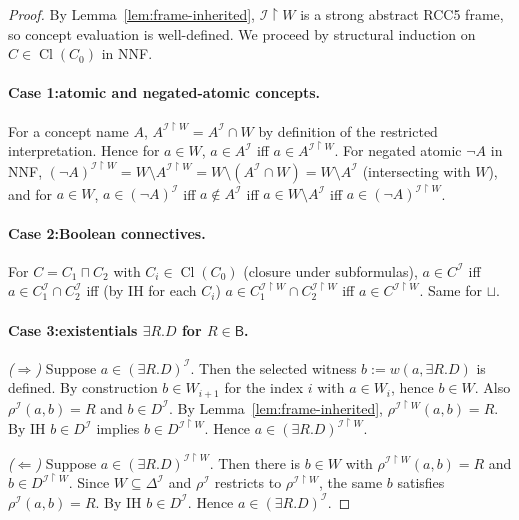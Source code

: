 \documentclass[11pt]{article}
\newcommand{\Cl}{\operatorname{Cl}}
\newcommand{\Base}{\mathsf{B}}
\newcommand{\I}{\mathcal{I}}
\begin{document}
\begin{proof}
By Lemma~\ref{lem:frame-inherited}, \(\I \restriction W\) is a
strong abstract RCC5 frame, so concept evaluation is well-defined.
We proceed by structural induction on \(C \in \Cl(C_0)\) in NNF.

\paragraph{Case 1:\@ atomic and negated-atomic concepts.}
For a concept name \(A\), \(A^{\I \restriction W} = A^\I \cap W\)
by definition of the restricted interpretation.  Hence for
\(a \in W\), \(a \in A^\I\) iff \(a \in A^{\I \restriction W}\).
For negated atomic \(\neg A\) in NNF,
\((\neg A)^{\I \restriction W} = W \setminus A^{\I \restriction W} =
W \setminus (A^\I \cap W) = W \setminus A^\I\) (intersecting with
\(W\)), and for \(a \in W\), \(a \in (\neg A)^\I\) iff \(a \notin A^\I\)
iff \(a \in W \setminus A^\I\) iff \(a \in (\neg A)^{\I \restriction W}\).

\paragraph{Case 2:\@ Boolean connectives.}
For \(C = C_1 \sqcap C_2\) with \(C_i \in \Cl(C_0)\) (closure under
subformulas), \(a \in C^\I\) iff \(a \in C_1^\I \cap C_2^\I\) iff
(by IH for each \(C_i\)) \(a \in C_1^{\I \restriction W} \cap
C_2^{\I \restriction W}\) iff \(a \in C^{\I \restriction W}\).
Same for \(\sqcup\).

\paragraph{Case 3:\@ existentials \(\exists R.D\) for \(R \in \Base\).}
\emph{(\(\Rightarrow\))} Suppose \(a \in (\exists R.D)^\I\).  Then
the selected witness \(b := w(a, \exists R.D)\) is defined.  By
construction \(b \in W_{i+1}\) for the index \(i\) with \(a \in W_i\),
hence \(b \in W\).  Also \(\rho^\I(a, b) = R\) and \(b \in D^\I\).
By Lemma~\ref{lem:frame-inherited},
\(\rho^{\I \restriction W}(a, b) = R\).  By IH \(b \in D^\I\) implies
\(b \in D^{\I \restriction W}\).  Hence
\(a \in (\exists R.D)^{\I \restriction W}\).

\emph{(\(\Leftarrow\))} Suppose \(a \in (\exists R.D)^{\I \restriction W}\).
Then there is \(b \in W\) with
\(\rho^{\I \restriction W}(a, b) = R\) and \(b \in D^{\I \restriction W}\).
Since \(W \subseteq \Delta^\I\) and \(\rho^\I\) restricts to
\(\rho^{\I \restriction W}\), the same \(b\) satisfies
\(\rho^\I(a, b) = R\).  By IH \(b \in D^\I\).  Hence
\(a \in (\exists R.D)^\I\).


\end{proof}
\end{document}
